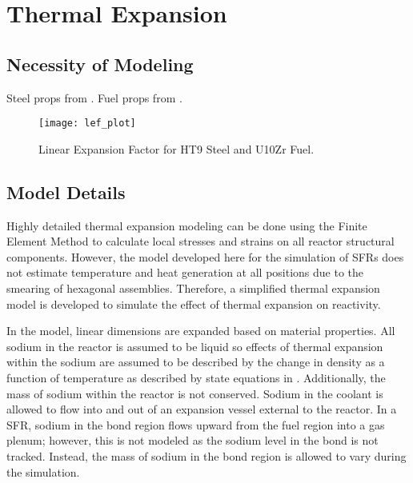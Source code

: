 \chapter{Thermal Expansion}
\label{ch:thermalExpansion}

\section{Necessity of Modeling}
  Steel props from \cite{ht9Prop}.
  Fuel props from \cite{thexpU10Zr}.

  \begin{figure}
    \centering
    \texttt{[image: lef\_plot]}
    \caption{Linear Expansion Factor for HT9 Steel and U10Zr Fuel.}
    \label{fig:lef_plot}
  \end{figure}

\section{Model Details}
  Highly detailed thermal expansion modeling can be done using the Finite
  Element Method to calculate local stresses and strains on all reactor
  structural components. However, the model developed here for the simulation of
  SFRs does not estimate temperature and heat generation at all positions due to
  the smearing of hexagonal assemblies. Therefore, a simplified thermal
  expansion model is developed to simulate the effect of thermal expansion on
  reactivity.

  In the model, linear dimensions are expanded based on material properties.
  All sodium in the reactor is assumed to be liquid so effects of thermal
  expansion within the sodium are assumed to be described by the change in
  density as a function of temperature as described by state equations in
  \cite{sodiumProp}. Additionally, the mass of sodium within the reactor is not
  conserved. Sodium in the coolant is allowed to flow into and out of an
  expansion vessel external to the reactor. In a SFR, sodium in the bond region
  flows upward from the fuel region into a gas plenum; however, this is not
  modeled as the sodium level in the bond is not tracked. Instead, the mass of
  sodium in the bond region is allowed to vary during the simulation.

